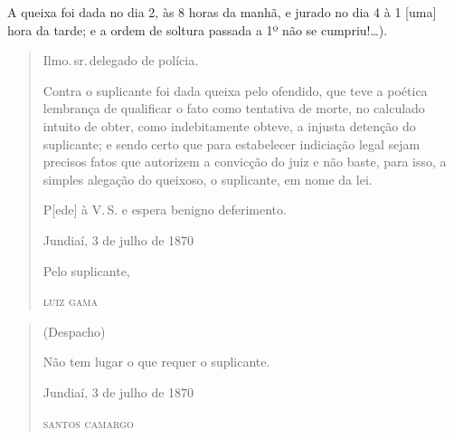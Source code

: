 A queixa foi dada no dia 2, às 8 horas da manhã, e jurado no dia 4 à 1
{[}uma{]} hora da tarde; e a ordem de soltura passada a 1º não se
cumpriu!\ldots{}).

\asterisc

\begin{quote}
Ilmo.\,sr.\,delegado de polícia.


Contra o suplicante foi dada queixa pelo ofendido, que teve a poética
lembrança de qualificar o fato como tentativa de morte, no calculado
intuito de obter, como indebitamente obteve, a injusta detenção do
suplicante; e sendo certo que para estabelecer indiciação legal sejam
precisos fatos que autorizem a convicção do juiz e não baste, para isso,
a simples alegação do queixoso, o suplicante, em nome da lei.

\noindent{}P{[}ede{]} à V.\,S. e espera benigno deferimento.

\medskip

\noindent{}Jundiaí, 3 de julho de 1870\smallskip

\noindent{}Pelo suplicante,

\noindent\textsc{luiz gama}
\end{quote}

\begin{quote}
\noindent{}(Despacho)

\noindent{}Não tem lugar o que requer o suplicante.

\noindent{}Jundiaí, 3 de julho de 1870\smallskip

\noindent\textsc{santos camargo}
\end{quote}

\asterisc

